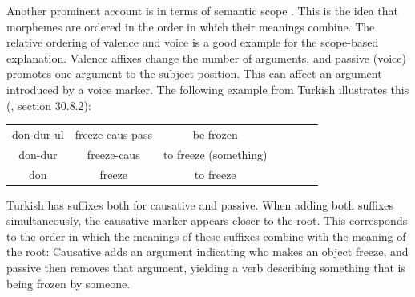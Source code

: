 \documentclass[11pt,letterpaper]{article}
\newcommand{\citep}{\parencite}
\newcommand\mhahn[1]{{\color{red}(#1)}}
\begin{document}






%

Another prominent account is in terms of semantic scope \citep{rice2000morpheme}.
This is the idea that morphemes are ordered in the order in which their meanings combine.
The relative ordering of valence and voice is a good example for the scope-based explanation.
Valence affixes change the number of arguments, and passive (voice) promotes one argument to the subject position.
This can affect an argument introduced by a voice marker.
The following example from Turkish illustrates this (\cite{schaaik2020turkish}, section 30.8.2):


\begin{tabular}{ccccccc}
don-dur-ul & freeze-caus-pass & be frozen \\
don-dur & freeze-caus & to freeze (something) \\
don & freeze& to freeze \\
\end{tabular}

Turkish has suffixes both for causative and passive.
When adding both suffixes simultaneously, the causative marker appears closer to the root.
This corresponds to the order in which the meanings of these suffixes combine with the meaning of the root:
Causative adds an argument indicating who makes an object freeze, and passive then removes that argument, yielding a verb describing something that is being frozen by someone.
\end{document}

